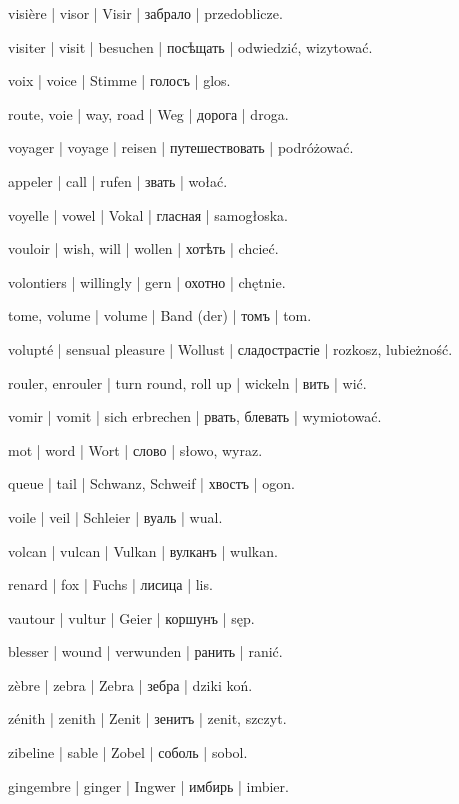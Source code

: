 \begin{outdent}{1em}
visière | visor | Visir | забрало | przedoblicze.

visiter | visit | besuchen | посѣщать | odwiedzić,
wizytować.

voix | voice | Stimme | голосъ | glos.

route, voie | way, road | Weg | дорога | droga.

voyager | voyage | reisen | путешествовать | podróżować.

appeler | call | rufen | звать | wołać.

voyelle | vowel | Vokal | гласная | samogłoska.

vouloir | wish, will | wollen | хотѣть | chcieć.

volontiers | willingly | gern | охотно | chętnie.

tome, volume | volume | Band (der) | томъ | tom.

volupté | sensual pleasure | Wollust | сладострастіе | rozkosz, lubieżność.

rouler, enrouler | turn round, roll up | wickeln | вить | wić.

vomir | vomit | sich erbrechen | рвать, блевать | wymiotować.

mot | word | Wort | слово | słowo, wyraz.

queue | tail | Schwanz, Schweif | хвостъ | ogon.

voile | veil | Schleier | вуаль | wual.

volcan | vulcan | Vulkan | вулканъ | wulkan.

renard | fox | Fuchs | лисица | lis.

vautour | vultur | Geier | коршунъ | sęp.

blesser | wound | verwunden | ранить | ranić.


zèbre | zebra | Zebra | зебра | dziki koń.

zénith | zenith | Zenit | зенитъ | zenit, szczyt.

zibeline | sable | Zobel | соболь | sobol.

gingembre | ginger | Ingwer | имбирь | imbier.


\end{outdent}
